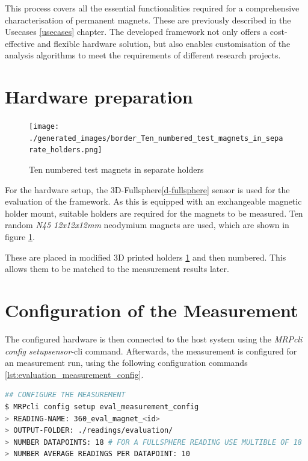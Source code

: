 This process covers all the essential functionalities required for a
comprehensive characterisation of permanent magnets. These are
previously described in the Usecases \ref{usecases} chapter. The
developed framework not only offers a cost-effective and flexible
hardware solution, but also enables customisation of the analysis
algorithms to meet the requirements of different research projects.

\hypertarget{hardware-preparation}{%
\section{Hardware preparation}\label{hardware-preparation}}

\begin{figure}
\centering
\texttt{[image: ./generated\_images/border\_Ten\_numbered\_test\_magnets\_in\_separate\_holders.png]}
\caption{Ten numbered test magnets in separate holders
\label{Ten_numbered_test_magnets_in_separate_holders.png}}
\end{figure}

For the hardware setup, the 3D-Fullsphere\ref{d-fullsphere} sensor is
used for the evaluation of the framework. As this is equipped with an
exchangeable magnetic holder mount, suitable holders are required for
the magnets to be measured. Ten random \emph{N45 12x12x12mm} neodymium
magnets are used, which are shown in figure
\ref{Ten_numbered_test_magnets_in_separate_holders.png}.

These are placed in modified 3D printed holders
\ref{Ten_numbered_test_magnets_in_separate_holders.png} and then
numbered. This allows them to be matched to the measurement results
later.

\hypertarget{configuration-of-the-measurement}{%
\section{Configuration of the
Measurement}\label{configuration-of-the-measurement}}

The configured hardware is then connected to the host system using the
\emph{MRPcli config setupsensor}-\gls{cli} command. Afterwards, the
measurement is configured for an measurement run, using the following
configuration commands \ref{lst:evaluation_measurement_config}.

\newpage

\begin{lstlisting}[language=bash, caption={Measurement configuration for evaluation measurement}, label=lst:evaluation_measurement_config]
## CONFIGURE THE MEASUREMENT
$ MRPcli config setup eval_measurement_config
> READING-NAME: 360_eval_magnet_<id>
> OUTPUT-FOLDER: ./readings/evaluation/ 
> NUMBER DATAPOINTS: 18 # FOR A FULLSPHERE READING USE MULTIBLE OF 18
> NUMBER AVERAGE READINGS PER DATAPOINT: 10
\end{lstlisting}

